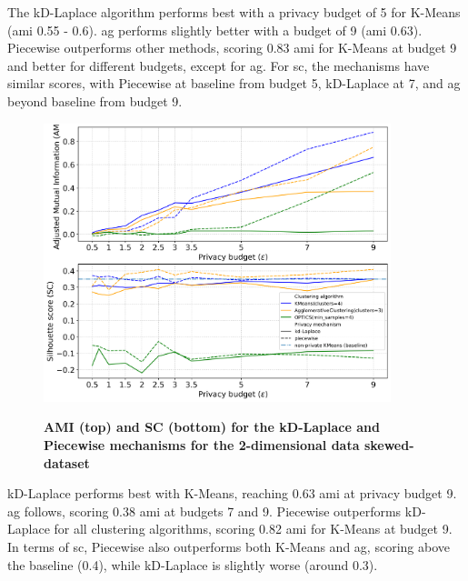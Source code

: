 The kD-Laplace algorithm performs best with a privacy budget of 5 for K-Means (\gls{ami} 0.55 - 0.6).
\gls{ag} performs slightly better with a budget of 9 (\gls{ami} 0.63).
Piecewise outperforms other methods, scoring 0.83 \gls{ami} for K-Means at budget 9 and better for different budgets, except for \gls{ag}.
For \gls{sc}, the mechanisms have similar scores, with Piecewise at baseline from budget 5, kD-Laplace at 7, and \gls{ag} beyond baseline from budget 9.

\newpage
\begin{figure}[H]
  \centering
  \caption{\textbf{AMI (top) and SC (bottom) for the kD-Laplace and Piecewise mechanisms for the 2-dimensional data skewed-dataset}}
  \includegraphics[width=0.9\textwidth]{Results/kd-laplace/kd-Laplace/skewed-dataset/ami-and-sc_2_dimensions.png}
  \label{fig:validation-skewed-dataset_comparison_2d-laplace}
\end{figure}
kD-Laplace performs best with K-Means, reaching 0.63 \gls{ami} at privacy budget 9.
\gls{ag} follows, scoring 0.38 \gls{ami} at budgets 7 and 9.
Piecewise outperforms kD-Laplace for all clustering algorithms, scoring 0.82 \gls{ami} for K-Means at budget 9.
In terms of \gls{sc}, Piecewise also outperforms both K-Means and \gls{ag}, scoring above the baseline (0.4), while kD-Laplace is slightly worse (around 0.3).
\newpage
